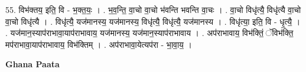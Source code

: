 \documentclass[17pt]{extarticle}
\begin{document}
55. विभ॑क्तय॒ इति॒ वि - भ॒क्त॒यः॒ । . भ॒व॒न्ति॒ वा॒चो वा॒चो भ॑वन्ति भवन्ति वा॒चः । . वा॒चो विधृ॑त्यै॒ विधृ॑त्यै वा॒चो वा॒चो विधृ॑त्यै । . विधृ॑त्यै॒ यज॑मानस्य॒ यज॑मानस्य॒ विधृ॑त्यै॒ विधृ॑त्यै॒ यज॑मानस्य । . विधृ॑त्या॒ इति॒ वि - धृ॒त्यै॒ । . यज॑मान॒स्याप॑राभावा॒याप॑राभावाय॒ यज॑मानस्य॒ यज॑मान॒स्याप॑राभावाय । . अप॑राभावाय॒ विभ॑क्तिं॒ ॅविभ॑क्ति॒ मप॑राभावा॒याप॑राभावाय॒ विभ॑क्तिम् । . अप॑राभावा॒येत्यप॑रा - भा॒वा॒य॒ । \newline

\textbf{Ghana Paata } \newline
\end{document}
